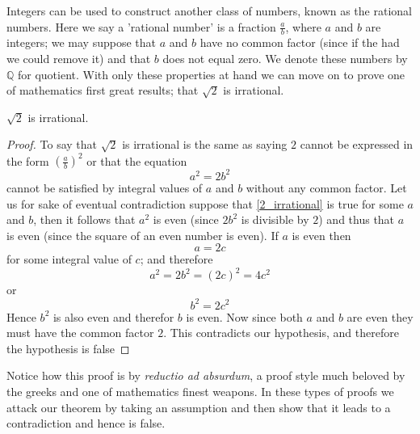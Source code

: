 Integers can be used to construct another class of numbers, known as the rational numbers. Here we say a 'rational number' is a fraction $\frac{a}{b}$, where $a$ and $b$ are integers; we may suppose that $a$ and $b$ have no common factor (since if the had we could remove it) and that $b$ does not equal zero. We denote these numbers by $\mathbb{Q}$ for quotient. With only these properties at hand we can move on to prove one of mathematics first great results; that $\sqrt{2}$ is irrational.
\begin{proposition}
$\sqrt{2}$ is irrational.
\end{proposition}
\begin{proof}
To say that $\sqrt{2}$ is irrational is the same as saying $2$ cannot be expressed in the form $\left(\frac{a}{b}\right)^2$ or that the equation
\begin{equation}\label{2_irrational}
a^2 = 2b^2
\end{equation}
cannot be satisfied by integral values of $a$ and $b$ without any common factor. Let us for sake of eventual contradiction suppose that \ref{2_irrational} is true for some $a$ and $b$, then it follows that $a^2$ is even (since $2b^2$ is divisible by $2$) and thus that $a$ is even (since the square of an even number is even). If $a$ is even then
\[
a = 2c
\]
for some integral value of $c$; and therefore
\[
 a^2 = 2b^2 = (2c)^2 = 4c^2
\]
or
\[
b^2 = 2c^2
\]
Hence $b^2$ is also even and therefor $b$ is even. Now since both $a$ and $b$ are even they must have the common factor $2$. This contradicts our hypothesis, and therefore the hypothesis is false
\end{proof}
Notice how this proof is by \emph{reductio ad absurdum}, a proof style much beloved by the greeks and one of mathematics finest weapons. In these types of proofs we attack our theorem by taking an assumption and then show that it leads to a contradiction and hence is false.

